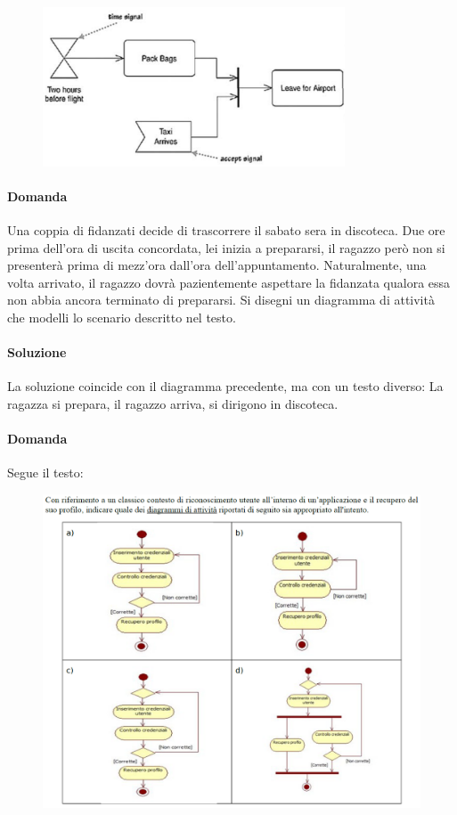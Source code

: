 \begin{figure}[H]\center
\includegraphics[width=0.8\textwidth]{res/img/Esercizi/sol-aeroporto}
\end{figure}

\paragraph{Domanda} 

Una coppia di fidanzati decide di trascorrere il sabato sera in discoteca. Due ore prima dell'ora di uscita concordata, lei
inizia a prepararsi, il ragazzo però non si presenterà prima di mezz'ora dall'ora dell'appuntamento. Naturalmente, una
volta arrivato, il ragazzo dovrà pazientemente aspettare la fidanzata qualora essa non abbia ancora terminato di prepararsi.
Si disegni un diagramma di attività che modelli lo scenario descritto nel testo.

\paragraph{Soluzione} La soluzione coincide con il diagramma precedente, ma con un testo diverso: La ragazza si prepara, il ragazzo arriva, si dirigono in discoteca.

\paragraph{Domanda} Segue il testo:

\begin{figure}[H]\center
\includegraphics[width=1\textwidth]{res/img/Esercizi/es-diagrammaAttivita}
\end{figure}

